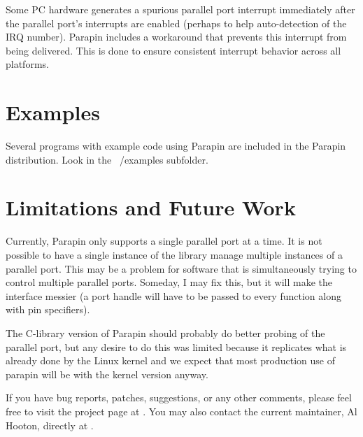 \documentclass{article}
\begin{document}
Some PC hardware generates a spurious parallel port interrupt
immediately after the parallel port's interrupts are enabled (perhaps
to help auto-detection of the IRQ number).  Parapin includes a
workaround that prevents this interrupt from being delivered.  This is
done to ensure consistent interrupt behavior across all platforms.


\section{Examples}

Several programs with example code using Parapin are included in
the Parapin distribution.  Look in the ~/examples subfolder.

\section{Limitations and Future Work}

Currently, Parapin only supports a single parallel port at a time.  It
is not possible to have a single instance of the library manage
multiple instances of a parallel port.  This may be a problem for
software that is simultaneously trying to control multiple parallel
ports.  Someday, I may fix this, but it will make the interface
messier (a port handle will have to be passed to every function along
with pin specifiers).

The C-library version of Parapin should probably do better probing of
the parallel port, but any desire to do this was limited because it
replicates what is already done by the Linux kernel and we expect that
most production
use of parapin will be with the kernel version anyway.

If you have bug reports, patches, suggestions, or any other comments,
please feel free to visit the project page at
.
You may also contact the current maintainer, Al Hooton, directly at
.
\end{document}
